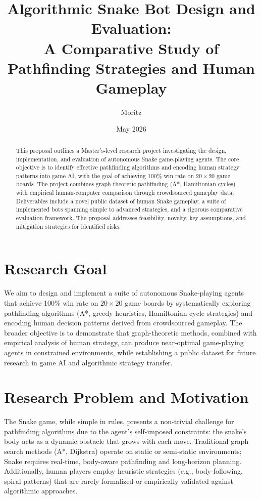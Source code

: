 \documentclass[11pt,a4paper]{article}
\title{\textbf{Algorithmic Snake Bot Design and Evaluation: \\
A Comparative Study of Pathfinding Strategies and Human Gameplay}}
\author{Moritz}
\date{May 2026}
\begin{document}
\maketitle

\begin{abstract}
This proposal outlines a Master's-level research project investigating the design, implementation, and evaluation of autonomous Snake game-playing agents. The core objective is to identify effective pathfinding algorithms and encoding human strategy patterns into game AI, with the goal of achieving 100\% win rate on $20 \times 20$ game boards. The project combines graph-theoretic pathfinding (A*, Hamiltonian cycles) with empirical human-computer comparison through crowdsourced gameplay data. Deliverables include a novel public dataset of human Snake gameplay, a suite of implemented bots spanning simple to advanced strategies, and a rigorous comparative evaluation framework. The proposal addresses feasibility, novelty, key assumptions, and mitigation strategies for identified risks.
\end{abstract}

\section{Research Goal}

We aim to design and implement a suite of autonomous Snake-playing agents that achieve 100\% win rate on $20 \times 20$ game boards by systematically exploring pathfinding algorithms (A*, greedy heuristics, Hamiltonian cycle strategies) and encoding human decision patterns derived from crowdsourced gameplay. The broader objective is to demonstrate that graph-theoretic methods, combined with empirical analysis of human strategy, can produce near-optimal game-playing agents in constrained environments, while establishing a public dataset for future research in game AI and algorithmic strategy transfer.

\section{Research Problem and Motivation}

The Snake game, while simple in rules, presents a non-trivial challenge for pathfinding algorithms due to the agent's self-imposed constraints: the snake's body acts as a dynamic obstacle that grows with each move. Traditional graph search methods (A*, Dijkstra) operate on static or semi-static environments; Snake requires real-time, body-aware pathfinding and long-horizon planning. Additionally, human players employ heuristic strategies (e.g., body-following, spiral patterns) that are rarely formalized or empirically validated against algorithmic approaches. 
\end{document}

